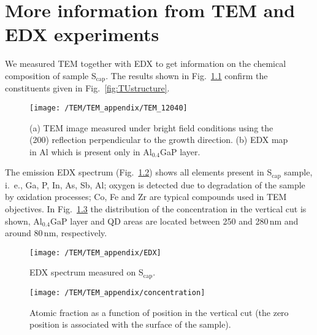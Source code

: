 \chapter{More information from TEM and EDX experiments}
\label{chapter:appendix_TEM}
We measured TEM together with EDX to get information on the chemical composition of sample S$_\mathrm{cap}$. The results shown in Fig.~\ref{fig:TEM_app} confirm the constituents given in Fig.~\ref{fig:TUstructure}.


\begin{figure}
	\centering
	\texttt{[image: /TEM/TEM\_appendix/TEM\_12040]}
	\caption{(a) TEM image measured under bright field conditions using the (200) reflection perpendicular to the growth direction. (b) EDX map in Al which is present only in Al$_{0.4}$GaP layer.}
	\label{fig:TEM_app}
\end{figure}

The emission EDX spectrum (Fig.~\ref{fig:EDX}) shows all elements present in S$_\mathrm{cap}$ sample, i.~e., Ga, P, In, As, Sb, Al; oxygen is detected due to degradation of the sample by oxidation processes; Co, Fe and Zr are typical compounds used in TEM objectives. In Fig.~\ref{fig:concentration_appendix} the distribution of the concentration in the vertical cut is shown, Al$_{0.4}$GaP layer and QD areas are located between 250 and 280$\,$nm and around 80$\,$nm, respectively.
\begin{figure}
	\centering
	\texttt{[image: /TEM/TEM\_appendix/EDX]}
	\caption{EDX spectrum measured on S$_\mathrm{cap}$.}
	\label{fig:EDX}
\end{figure}


\begin{figure}
	\centering
	\texttt{[image: /TEM/TEM\_appendix/concentration]}
	\caption{Atomic fraction as a function of position in the vertical cut (the zero position is associated with the surface of the sample).}
	\label{fig:concentration_appendix}
\end{figure}

\newpage 